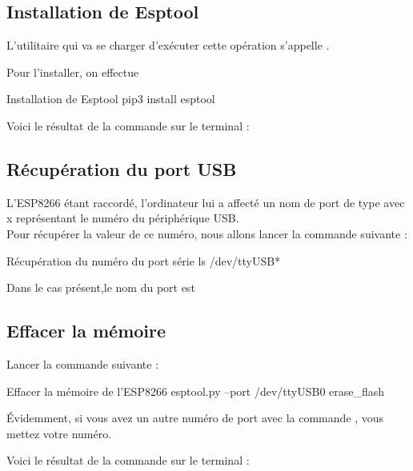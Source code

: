 {\subsection{Installation de Esptool}

L'utilitaire qui va se charger d'exécuter cette opération s'appelle .

Pour l'installer, on effectue

\begin{Bash}{Installation de Esptool}
pip3 install esptool
\end{Bash}

Voici le résultat de la commande sur le terminal : 




\subsection{Récupération du port USB}

L'ESP8266 étant raccordé, l'ordinateur lui a affecté un nom de port de type  avec x représentant le numéro du périphérique USB. \\

Pour récupérer la valeur de ce numéro, nous allons lancer la commande suivante : 

\begin{Bash}{Récupération du numéro du port série}
ls /dev/ttyUSB*
\end{Bash}


Dans le cas présent,le nom du port est 

\subsection{Effacer la mémoire}

Lancer la commande suivante : 
\begin{Bash}{Effacer la mémoire de l'ESP8266}
esptool.py --port /dev/ttyUSB0 erase_flash
\end{Bash}

Évidemment, si vous avez un autre numéro de port avec la commande , vous mettez votre numéro.

Voici le résultat de la commande sur le terminal : 

}
